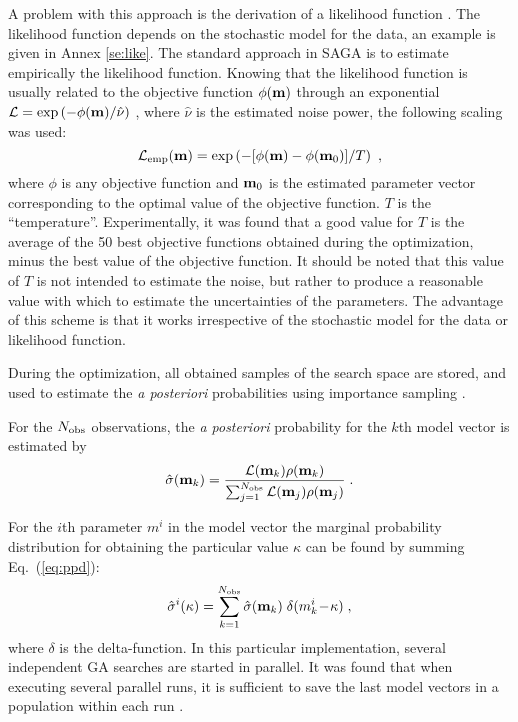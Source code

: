 \documentclass{saclantc}
\newcommand{\Nobs}{N_{\rm obs}}
\begin{document}
A problem with this approach is the derivation of a likelihood function \cite{gerstoft:asa98}.
The likelihood function depends on the stochastic model for the data,
 an example  is given in Annex \ref{se:like}. 
The standard approach in {\sf SAGA} is to estimate empirically the
likelihood function. 
Knowing that the likelihood function is usually  related to the
objective function $\phi( {\bf m}) $
through an exponential ${\cal L}=\exp \left(-\phi( {\bf m})/\hat{\nu} \right)$ 
\cite{tarantola}, where $\hat{\nu}$ is the estimated noise power, the following
scaling was used:
\begin{equation}\label{eq:GA-scaling}
{\cal L}_{\rm emp}({\bf m})= \exp \left(-[\phi( {\bf m})-\phi( {\bf m}_0)]/ T \right)~,
\end{equation}
where $ \phi $ is any objective function and ${\bf m}_0$ is the estimated
parameter vector corresponding to the optimal value of the objective
function. $T$ is the
``temperature''. Experimentally, it was found that a good value 
for $T$ is the average of the 50 best objective functions obtained
during the optimization, minus the best value of the objective
function. 
It should be noted that this value of $T$ is
not intended to estimate the noise, but rather to produce a
reasonable value with which to  estimate the uncertainties of the parameters.
The advantage of this scheme is that it works irrespective of the stochastic model for the data or likelihood function. 

During the optimization, all obtained samples of the search space are
stored, and used to estimate the {\it a posteriori} probabilities using
importance sampling \cite{gerstoft:asa98}. 

For the $\Nobs$ observations, the {\it a posteriori\/} probability for 
the $k$th model vector is  estimated by 
\begin{equation}
  \hat\sigma({\bf m}_k) = {{{ \cal L}({\bf m}_k) \rho({\bf m}_k)} 
\over{  \sum_{j=1}^{\Nobs}  { \cal L}({\bf m}_j)} \rho({\bf m}_j) }\;.
\label{eq:ppd}
\end{equation}


For the $i$th parameter $m^i$ in the model vector the marginal probability
distribution for obtaining the particular value $\kappa$
can be found by summing  Eq.~(\ref{eq:ppd}):
\begin{equation}
  \hat\sigma^i(\kappa) =
{{ \sum_{k=1}^{\Nobs} { \hat\sigma}({\bf m}_k) \;
\delta(m_k^i \! - \! \kappa)}}\;,
\end{equation}
where $\delta$ is the delta-function.
In this particular implementation, several independent GA searches are
started in parallel.
It was found that when executing several parallel runs, it is sufficient
to save the last model vectors in a population within each run \cite{gerstoft:asa94}. 
\end{document}
